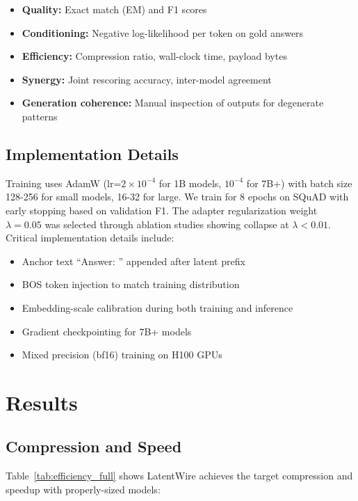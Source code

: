 \documentclass{article}
\begin{document}
\begin{itemize}
\item \textbf{Quality:} Exact match (EM) and F1 scores
\item \textbf{Conditioning:} Negative log-likelihood per token on gold answers
\item \textbf{Efficiency:} Compression ratio, wall-clock time, payload bytes
\item \textbf{Synergy:} Joint rescoring accuracy, inter-model agreement
\item \textbf{Generation coherence:} Manual inspection of outputs for degenerate patterns
\end{itemize}

\subsection{Implementation Details}

Training uses AdamW (lr=$2 \times 10^{-4}$ for 1B models, $10^{-4}$ for 7B+) with batch size 128-256 for small models, 16-32 for large. We train for 8 epochs on SQuAD with early stopping based on validation F1. The adapter regularization weight $\lambda=0.05$ was selected through ablation studies showing collapse at $\lambda < 0.01$. Critical implementation details include:
\begin{itemize}
\item Anchor text ``Answer: '' appended after latent prefix
\item BOS token injection to match training distribution
\item Embedding-scale calibration during both training and inference
\item Gradient checkpointing for 7B+ models
\item Mixed precision (bf16) training on H100 GPUs
\end{itemize}

\section{Results}

\subsection{Compression and Speed}

Table~\ref{tab:efficiency_full} shows LatentWire achieves the target compression and speedup with properly-sized models:
\end{document}
